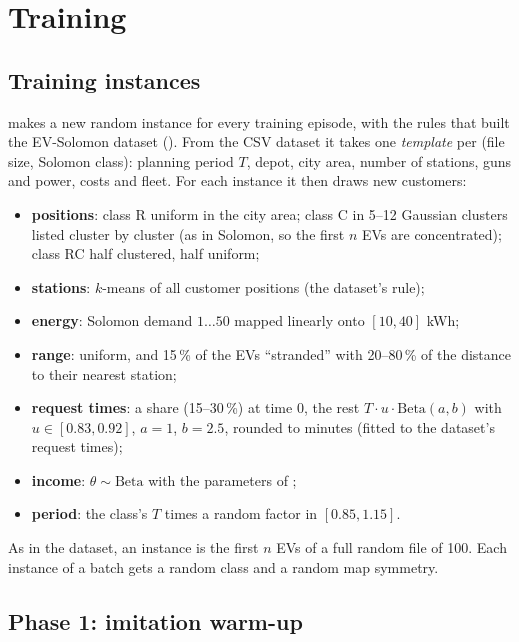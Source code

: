 \section{Training}
\label{sec:training}

\subsection{Training instances}
\label{sec:generator}

 makes a new random instance for every training episode, with the rules that built the EV-Solomon dataset (). From the CSV dataset it takes one \emph{template} per (file size, Solomon class): planning period $T$, depot, city area, number of stations, guns and power, costs and fleet. For each instance it then draws new customers:
\begin{itemize}
  \item \textbf{positions}: class R uniform in the city area; class C in 5--12 Gaussian clusters listed cluster by cluster (as in Solomon, so the first $n$ EVs are concentrated); class RC half clustered, half uniform;
  \item \textbf{stations}: $k$-means of all customer positions (the dataset's rule);
  \item \textbf{energy}: Solomon demand $1\ldots50$ mapped linearly onto $[10,40]$ kWh;
  \item \textbf{range}: uniform, and 15\,\% of the EVs ``stranded'' with 20--80\,\% of the distance to their nearest station;
  \item \textbf{request times}: a share (15--30\,\%) at time 0, the rest $T\cdot u\cdot\mathrm{Beta}(a,b)$ with $u\in[0.83,0.92]$, $a=1$, $b=2.5$, rounded to minutes (fitted to the dataset's request times);
  \item \textbf{income}: $\theta\sim\mathrm{Beta}$ with the parameters of ;
  \item \textbf{period}: the class's $T$ times a random factor in $[0.85,1.15]$.
\end{itemize}
As in the dataset, an instance is the first $n$ EVs of a full random file of 100. Each instance of a batch gets a random class and a random map symmetry.

\subsection{Phase 1: imitation warm-up}


